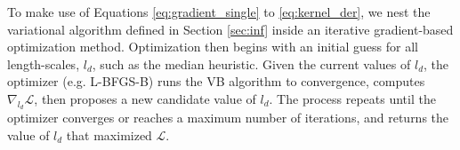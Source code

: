 To make use of Equations \ref{eq:gradient_single} to \ref{eq:kernel_der},
we nest the variational algorithm defined in Section \ref{sec:inf} inside
an iterative gradient-based optimization method.
Optimization then begins with an initial guess for all length-scales, $l_d$,
such as the median heuristic.
Given the current values of $l_d$, the optimizer (e.g. L-BFGS-B)
runs the VB algorithm to convergence, 
computes $\nabla_{l_{\! d}} \mathcal{L}$,
then proposes a new candidate value of $l_d$.
The process repeats until the optimizer converges or reaches a maximum number 
of iterations, and returns the value of $l_d$ that maximized $\mathcal{L}$.

